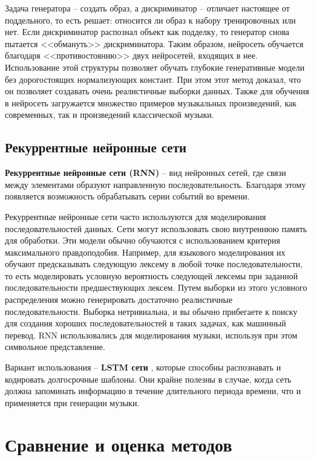 Задача генератора -- создать образ, а дискриминатор -- отличает настоящее от поддельного, то есть решает: относится ли образ к набору тренировочных или нет. Если дискриминатор распознал объект как подделку, то генератор снова пытается <<обмануть>> дискриминатора. Таким образом, нейросеть обучается благодаря <<противостоянию>> двух нейросетей, входящих в нее. Использование этой структуры позволяет обучать глубокие генеративные модели без дорогостоящих нормализующих констант. При этом этот метод доказал, что он позволяет создавать очень реалистичные выборки данных. Также для обучения в нейросеть загружается множество примеров музыкальных произведений, как современных, так и произведений классической музыки.


\subsection{Рекуррентные нейронные сети}

\textbf{Рекуррентные нейронные сети (RNN)} \cite{rnn} -- вид нейронных сетей, где связи между элементами образуют направленную последовательность. Благодаря этому появляется возможность обрабатывать серии событий во времени.

Рекуррентные нейронные сети часто используются для моделирования последовательностей данных. Сети могут использовать свою внутреннюю память для обработки. Эти модели обычно обучаются с использованием критерия максимального правдоподобия. Например, для языкового моделирования их обучают предсказывать следующую лексему в любой точке последовательности, то есть моделировать условную вероятность следующей лексемы при заданной последовательности предшествующих лексем. Путем выборки из этого условного распределения можно генерировать достаточно реалистичные последовательности. Выборка нетривиальна, и вы обычно прибегаете к поиску для создания хороших последовательностей в таких задачах, как машинный перевод. RNN использовались для моделирования музыки, используя при этом символьное представление.

Вариант использования -- \textbf{LSTM сети} \cite{lstm}, которые способны распознавать и кодировать долгосрочные шаблоны. Они крайне полезны в случае, когда сеть должна запоминать информацию в течение длительного периода времени, что и применяется при генерации музыки.


\section{Сравнение и оценка методов}


